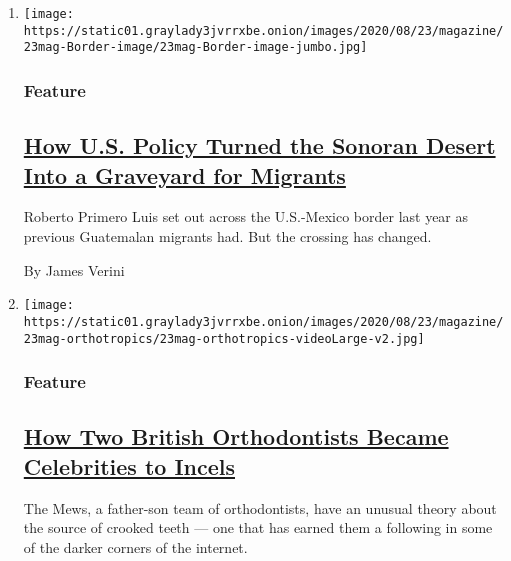\begin{enumerate}
\def\labelenumi{\arabic{enumi}.}
\item
  \texttt{[image: https://static01.graylady3jvrrxbe.onion/images/2020/08/23/magazine/23mag-Border-image/23mag-Border-image-jumbo.jpg]}

  \hypertarget{feature}{%
  \subsubsection{Feature}\label{feature}}

  \hypertarget{how-us-policy-turned-the-sonoran-desert-into-a-graveyard-for-migrants}{%
  \subsection{\texorpdfstring{\href{/2020/08/18/magazine/border-crossing.html}{How
  U.S. Policy Turned the Sonoran Desert Into a Graveyard for
  Migrants}}{How U.S. Policy Turned the Sonoran Desert Into a Graveyard for Migrants}}\label{how-us-policy-turned-the-sonoran-desert-into-a-graveyard-for-migrants}}

  Roberto Primero Luis set out across the U.S.-Mexico border last year
  as previous Guatemalan migrants had. But the crossing has changed.

  By James Verini
\item
  \texttt{[image: https://static01.graylady3jvrrxbe.onion/images/2020/08/23/magazine/23mag-orthotropics/23mag-orthotropics-videoLarge-v2.jpg]}

  \hypertarget{feature-1}{%
  \subsubsection{Feature}\label{feature-1}}

  \hypertarget{how-two-british-orthodontists-became-celebrities-to-incels}{%
  \subsection{\texorpdfstring{\href{/2020/08/20/magazine/teeth-mewing-incels.html}{How
  Two British Orthodontists Became Celebrities to
  Incels}}{How Two British Orthodontists Became Celebrities to Incels}}\label{how-two-british-orthodontists-became-celebrities-to-incels}}

  The Mews, a father-son team of orthodontists, have an unusual theory
  about the source of crooked teeth --- one that has earned them a
  following in some of the darker corners of the internet.


\end{enumerate}
